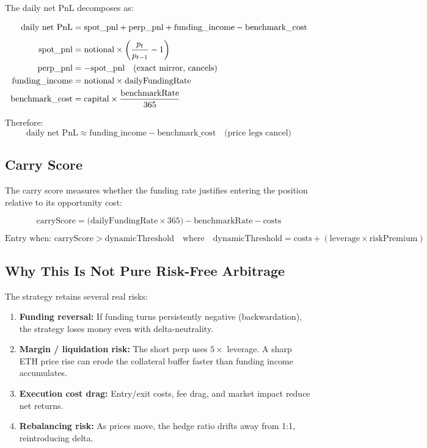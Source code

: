 \documentclass[11pt,a4paper]{article}
\begin{document}
The daily net PnL decomposes as:

\begin{align}
    \text{daily net PnL} &= \text{spot\_pnl} + \text{perp\_pnl} + \text{funding\_income} - \text{benchmark\_cost} \notag \\[4pt]
    \text{spot\_pnl}       &= \text{notional} \times \left(\frac{p_t}{p_{t-1}} - 1\right) \notag \\
    \text{perp\_pnl}       &= -\text{spot\_pnl} \quad \text{(exact mirror, cancels)} \notag \\
    \text{funding\_income} &= \text{notional} \times \text{dailyFundingRate} \notag \\
    \text{benchmark\_cost} &= \text{capital} \times \frac{\text{benchmarkRate}}{365} \notag
\end{align}

Therefore:
\[
    \text{daily net PnL} \approx \text{funding\_income} - \text{benchmark\_cost}
    \quad \text{(price legs cancel)}
\]

\subsection{Carry Score}

The carry score measures whether the funding rate justifies entering the position relative to its opportunity cost:

\[
    \text{carryScore} = \bigl(\text{dailyFundingRate} \times 365\bigr) - \text{benchmarkRate} - \text{costs}
\]

\[
    \text{Entry when: carryScore} > \text{dynamicThreshold}
    \quad \text{where} \quad
    \text{dynamicThreshold} = \text{costs} + (\text{leverage} \times \text{riskPremium})
\]

\subsection{Why This Is Not Pure Risk-Free Arbitrage}

The strategy retains several real risks:
\begin{enumerate}
    \item \textbf{Funding reversal:} If funding turns persistently negative (backwardation), the strategy loses money even with delta-neutrality.
    \item \textbf{Margin / liquidation risk:} The short perp uses $5\times$ leverage. A sharp ETH price rise can erode the collateral buffer faster than funding income accumulates.
    \item \textbf{Execution cost drag:} Entry/exit costs, fee drag, and market impact reduce net returns.
    \item \textbf{Rebalancing risk:} As prices move, the hedge ratio drifts away from 1:1, reintroducing delta.
\end{enumerate}
\end{document}
